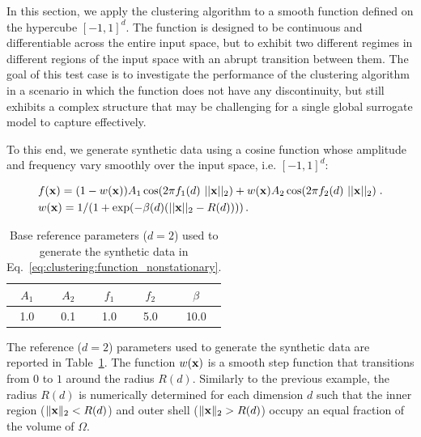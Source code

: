 In this section, we apply the clustering algorithm to a smooth function defined on the hypercube $[-1,1]^d$. The function is designed to be continuous and differentiable across the entire input space, but to exhibit two different regimes in different regions of the input space with an abrupt transition between them. The goal of this test case is to investigate the performance of the clustering algorithm in a scenario in which the function does not have any discontinuity, but still exhibits a complex structure that may be challenging for a single global surrogate model to capture effectively.

\smallskip
To this end, we generate synthetic data using a cosine function whose amplitude and frequency vary smoothly over the input space, i.e. $[-1,1]^d$:

\begin{equation}
  \left. 
    \begin{aligned}
      &f(\mathbf{x}) = (1-w(\mathbf{x})) A_1 \cos(2 \pi f_1(d)\ ||\mathbf{x}||_2) + w(\mathbf{x}) A_2 \cos(2 \pi f_2(d)\ ||\mathbf{x}||_2) \;.\\
      &w(\mathbf{x}) = 1/(1+\exp( -\beta(d) (||\mathbf{x}||_2 - R(d)))) \,.
    \end{aligned}
  \right.
  \label{eq:clustering:function_nonstationary}
\end{equation}

\begin{table}[htbp]
  \centering
  \begin{tabular}{|ccccc|}
    \hline
    $A_1$ & $A_2$ & $f_1$ & $f_2$ & $\beta$ \\
    \hline
    1.0 & 0.1 & 1.0 & 5.0 & 10.0 \\
    \hline
  \end{tabular}
  \caption{Base reference parameters ($d=2$) used to generate the synthetic data in Eq.~\eqref{eq:clustering:function_nonstationary}.}
  \label{tab:params_synthetic}
\end{table}

The reference ($d=2$) parameters used to generate the synthetic data are reported in Table~\ref{tab:params_synthetic}. The function $w(\mathbf{x})$ is a smooth step function that transitions from $0$ to $1$ around the radius $R(d)$. Similarly to the previous example, the radius $R(d)$ is numerically determined for each dimension $d$ such that the inner region ($\|\mathbf{x}\|_2 < R(d)$) and outer shell ($\|\mathbf{x}\|_2 > R(d)$) occupy an equal fraction of the volume of $\Omega$. 

